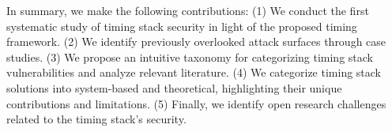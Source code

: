 In summary, we make the following contributions: (1) We conduct the first systematic study of timing stack security in light of the proposed timing framework. (2) We identify previously overlooked attack surfaces through case studies. (3) We propose an intuitive taxonomy for categorizing timing stack vulnerabilities and analyze relevant literature. (4) We categorize timing stack solutions into system-based and theoretical, highlighting their unique contributions and limitations. (5) Finally, we identify open research challenges related to the timing stack's security.

